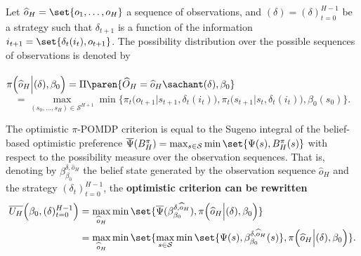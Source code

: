 \begin{theorem}
\label{piPOMDPrewriting}
Let $\widehat{o}_H = \set{o_1,\ldots,o_H}$ a sequence of observations,
and $(\delta) = (\delta)_{t=0}^{H-1}$ be a strategy 
such that $\delta_{t+1}$ is a function of the information $i_{t+1}=\set{ \delta_t(i_t), o_{t+1} }$.
The possibility distribution over the possible sequences of observations is denoted by\\
\\ 
$\pi \Big( \widehat{o}_H \Big\vert (\delta), \beta_0 \Big) = \Pi \paren{ \widehat{O}_{H} = \widehat{o}_H \sachant (\delta), \beta_0 }$
 \[ = \max_{(s_0,\ldots,s_H) \in \mathcal{S}^{H+1}} \min \bigg\{ \pi_t \Big( o_{t+1} \Big\vert s_{t+1}, \delta_t(i_t) \Big), \pi_t \Big( s_{t+1} \Big\vert s_t, \delta_t(i_t) \Big), \beta_0(s_0) \bigg\}. \]

The optimistic $\pi$-POMDP criterion is equal to the Sugeno integral 
of the belief-based optimistic preference $\overline{\Psi}(B_H^{\pi}) = \max_{s \in \mathcal{S}} \min \set{ \Psi(s), B^{\pi}_H(s) }$ 
with respect to the possibility measure over the observation sequences.
That is, denoting by $\beta^{\delta,\widehat{o}_H}_{\beta_0}$
the belief state generated by the observation sequence $\widehat{o}_H$ and the strategy $(\delta_t)_{t=0}^{H-1}$,
the \textbf{optimistic criterion can be rewritten}
\begin{align}
\label{piPOMDPoptrewriting}
\overline{U_H}\Big(\beta_0,(\delta)_{t=0}^{H-1}\Big) &= \max_{\widehat{o}_H} \min \set{ \overline{\Psi}(\beta^{\delta,\widehat{o}_H}_{\beta_0}),  \pi \Big( \widehat{o}_H \Big\vert (\delta), \beta_0 \Big) } \\
\nonumber &= \max_{\widehat{o}_H} \min \set{  \max_{s \in \mathcal{S}} \min \set{ \Psi(s),\beta^{\delta,\widehat{o}_H}_{\beta_0}(s) },  \pi \Big( \widehat{o}_H \Big\vert (\delta), \beta_0 \Big) }.
\end{align}


\end{theorem}
